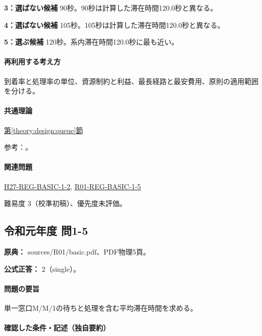\noindent\textbf{3：選ばない候補} 90秒。90秒は計算した滞在時間120.0秒と異なる。\par

\noindent\textbf{4：選ばない候補} 105秒。105秒は計算した滞在時間120.0秒と異なる。\par

\noindent\textbf{5：選ぶ候補} 120秒。系内滞在時間120.0秒に最も近い。\par

\paragraph{再利用する考え方} 到着率と処理率の単位、資源制約と利益、最長経路と最安費用、原則の適用範囲を分ける。

\paragraph{共通理論} \hyperref[theory:design:queue]{第\ref*{theory:design:queue}節}

\par 参考：\cite{design48_queue_ref}。

\paragraph{関連問題} \hyperref[q:h27-reg-basic-1-2]{H27-REG-BASIC-1-2}, \hyperref[q:r01-reg-basic-1-5]{R01-REG-BASIC-1-5}

\par 難易度 3（校準初稿）、優先度未評価。

\subsection{令和元年度 問1-5}
\label{q:r01-reg-basic-1-5}

\noindent\textbf{原典：} sources/R01/basic.pdf、PDF物理5頁。

\textbf{公式正答：} 2（single）。

\paragraph{問題の要旨} 単一窓口M/M/1の待ちと処理を含む平均滞在時間を求める。

\paragraph{確認した条件・記述（独自要約）}\mbox{}\par

